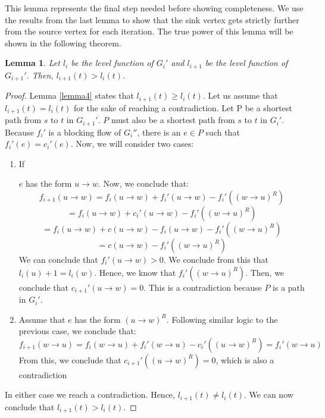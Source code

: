 \documentclass{report}
\newtheorem{lemma}{Lemma}[section]
\begin{document}
This lemma represents the final step needed before showing completeness. We use the results from the last lemma to show that the sink vertex gets strictly further from the source vertex for each iteration. The true power of this lemma will be shown in the following theorem.
\begin{lemma}
    Let $l_i$ be the level function of $G_i'$ and $l_{i+1}$ be the level function of $G_{i+1}'$. Then, $l_{i+1}(t) > l_i(t)$.
\end{lemma}
\begin{proof}
    Lemma \ref{lemma4} states that $l_{i+1}(t) \ge l_i(t)$. Let us assume that $l_{i+1}(t) = l_i(t)$ for the sake of reaching a contradiction. Let P be a shortest path from $s$ to $t$ in $G_{i+1}'$. $P$ must also be a shortest path from $s$ to $t$ in $G_i'$. Because $f_i'$ is a blocking flow of $G_i''$, there is an $e \in P$ such that $f_i'(e) = c_i'(e)$. Now, we will consider two cases:
    \begin{enumerate}
        \item
            If

 $e$ has the form $u \rightarrow w$. Now, we conclude that:
            $$f_{i+1}(u \rightarrow w) = f_i(u \rightarrow w) + f_i'(u \rightarrow w) - f_i'((w \rightarrow u)^R)$$
            $$= f_i(u \rightarrow w) + c_i'(u \rightarrow w) - f_i'((w \rightarrow u)^R)$$
            $$= f_i(u \rightarrow w) + c(u \rightarrow w) - f_i(u \rightarrow w) - f_i'((w \rightarrow u)^R)$$
            $$= c(u \rightarrow w) - f_i'((w \rightarrow u)^R)$$
            We can conclude that $f_i'(u \rightarrow w) > 0$. We conclude from this that $l_i(u) + 1 = l_i(w)$. Hence, we know that $f_i'((w \rightarrow u)^R)$. Then, we conclude that $c_{i+1}'(u \rightarrow w) = 0$. This is a contradiction because $P$ is a path in $G_i'$.
        \item
            Assume that $e$ has the form $(u \rightarrow w)^R$. Following similar logic to the previous case, we conclude that:
            $$f_{i+1}(w \rightarrow u) = f_i(w \rightarrow u) + f_i'(w \rightarrow u) - c_i'((u \rightarrow w)^R) = f_i'(w \rightarrow u)$$
            From this, we conclude that $c_{i+1}'((u \rightarrow w)^R) = 0$, which is also a contradiction
    \end{enumerate}
    In either case we reach a contradiction. Hence, $l_{i+1}(t) \ne l_i(t)$. We can now conclude that $l_{i+1}(t) > l_i(t)$.
\end{proof}
\end{document}
